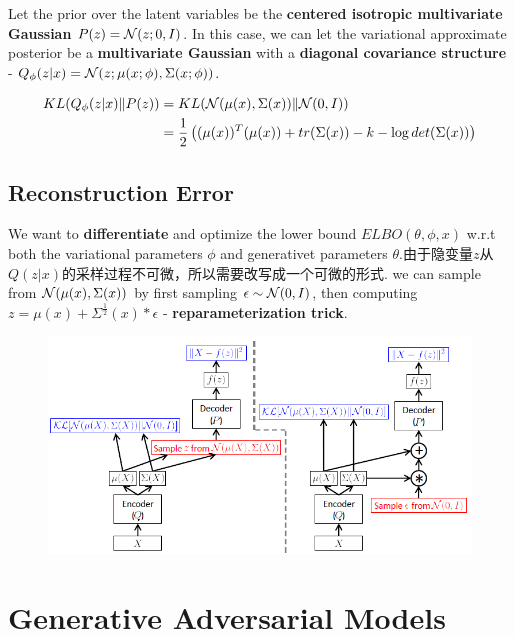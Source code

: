 Let the prior over the latent variables be the \textbf{centered isotropic multivariate Gaussian} $P(z) = \mathcal{N} (z; 0, I)$. In this case, we can
let the variational approximate posterior be a \textbf{multivariate Gaussian} with a \textbf{diagonal covariance structure}
- $Q_{\phi}(z|x) = \mathcal{N} (z; \mu(x; \phi), \Sigma(x; \phi))$.

\begin{equation}
    \begin{split}
        KL(Q_{\phi}(z|x)\|P(z))
        &= KL(\mathcal{N}(\mu(x), \Sigma(x))\|\mathcal{N}(0, I)) \\
        &= \frac{1}{2}\left((\mu(x))^T(\mu(x)) + tr (\Sigma(x)) - k - \log det (\Sigma(x))\right)
    \end{split}
\end{equation}

\subsection{Reconstruction Error}
We want to \textbf{differentiate} and optimize the lower bound $ELBO(\theta, \phi, x)$ w.r.t both the variational
parameters $\phi$ and generativet parameters $\theta$.由于隐变量$z$从$Q(z|x)$的采样过程不可微，所以需要改写成一个可微的形式.
we can sample from
$\mathcal{N}(\mu(x), \Sigma(x))$ by first sampling $\epsilon \sim \mathcal{N}(0, I)$, then computing
$z = \mu(x) + \Sigma^{\frac{1}{2}}(x) * \epsilon$ - \textbf{reparameterization trick}.

\begin{figure}[H]
    \centering
    \includegraphics[width=12cm]{images/vae_reparameterization_trick.png}
    \label{fig:vae_reparameterization_trick}
\end{figure}

\section{Generative Adversarial Models}

